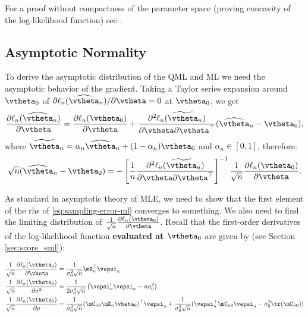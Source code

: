 For a proof without compactness of the parameter space (proving concavity of the log-likelihood function) see \cite{liu2022consistency}.

\subsection{Asymptotic Normality}

To derive the asymptotic distribution of the QML and ML we need the asymptotic behavior of the gradient. Taking a Taylor series expansion around $\vtheta_0$ of $\partial \ell_n(\widehat{\vtheta}_n)/ \partial \vtheta = 0$ at $\vtheta_0$, we get
\begin{equation}
  \frac{\partial \ell_n(\widehat{\vtheta}_n)}{\partial \vtheta} =  \frac{\partial \ell_n(\vtheta_0)}{\partial \vtheta} + \frac{\partial^2 \ell_n(\widetilde{\vtheta}_n)}{\partial \vtheta \partial \vtheta^\top}(\widehat{\vtheta}_n - \vtheta_0),
\end{equation}
%
where $\widetilde{\vtheta}_n = \alpha_n \widehat{\vtheta}_n + (1 - \alpha_n)\vtheta_0$ and $\alpha_n\in \left[ 0, 1\right]$, therefore:
\begin{equation}\label{eq:sampling-error-ml}
  \sqrt{n}(\widehat{\vtheta}_n - \vtheta_0) = - \left[\frac{1}{n}\frac{\partial^2 \ell_n(\widetilde{\vtheta}_n)}{\partial \vtheta \partial \vtheta^\top}\right]^{-1}\frac{1}{\sqrt{n}}\frac{\partial \ell_n(\vtheta_0)}{\partial \vtheta}.
\end{equation}

As standard in asymptotic theory of MLE, we need to show that the first element of the rhs of \eqref{eq:sampling-error-ml} converges to something. We also need to find the limiting distribution of $\frac{1}{\sqrt{n}}\frac{\partial \ell_n(\vtheta_0)}{\partial \vtheta}$. Recall that the first-order derivatives of the log-likelihood function \textbf{evaluated at $\vtheta_0$} are given by (see Section \ref{sec:score_sml}):

\begin{align}
	\frac{1}{\sqrt{n}}\frac{\partial \ell_n(\vtheta_0)}{\partial \vbeta} & = \frac{1}{\sigma^2_0\sqrt{n}}\mX_n^\top\vepsi_n \\
	\frac{1}{\sqrt{n}}\frac{\partial \ell_n(\vtheta_0)}{\partial \sigma^2} & = \frac{1}{2\sigma_0^4\sqrt{n}}\left(\vepsi_n'\vepsi_n - n\sigma_0^2\right) \\
		\frac{1}{\sqrt{n}}\frac{\partial \ell_n(\vtheta_0)}{\partial \rho} & = \frac{1}{\sigma_0^2\sqrt{n}}(\mC_{n0}\mX_n\vbeta_0)^\top \vepsi_n + \frac{1}{\sigma_0^2\sqrt{n}}(\vepsi_n^\top\mC_{n0}\vepsi_n - \sigma_0^2\tr(\mC_{n0}))\label{eq:asy_der_rho}
\end{align}	

